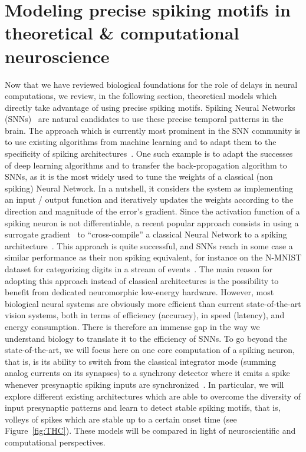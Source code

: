 \documentclass[brainsci, %
               review,submit,pdftex,moreauthors
               ]{Definitions/mdpi}
\begin{document}
\section{Modeling precise spiking motifs in theoretical \& computational neuroscience}
Now that we have reviewed biological foundations for the role of delays in neural computations, we review, in the following section, theoretical models which directly take advantage of using precise spiking motifs. 
Spiking Neural Networks (SNNs)~\citep{maass_networks_1997} are natural candidates to use these precise temporal patterns in the brain. The approach which is currently most prominent in the SNN community is to use existing algorithms from machine learning and to adapt them to the specificity of spiking architectures~\citep{goltz_fast_2021}. One such example is to adapt the successes of deep learning algorithms and to transfer the back-propagation algorithm to SNNs, as it is the most widely used to tune the weights of a classical (non spiking) Neural Network. In a nutshell, it considers the system as implementing an input / output function and iteratively updates the weights according to the direction and magnitude of the error's gradient. Since the activation function of a spiking neuron is not differentiable, a recent popular approach consists in using a surrogate gradient~\citep{neftci_surrogate_2019} to ``cross-compile'' a classical Neural Network to a spiking architecture~\citep{rueckauer_conversion_2017}. This approach is quite successful, and SNNs reach in some case a similar performance as their non spiking equivalent, for instance on the N-MNIST dataset for categorizing digits in a stream of events~\citep{susi_nmnsd-spiking_2021}. The main reason for adopting this approach instead of classical architectures is the possibility to benefit from dedicated neuromorphic low-energy hardware. However, most biological neural systems are obviously more efficient than current state-of-the-art vision systems, both in terms of efficiency (accuracy), in speed (latency), and energy consumption. There is therefore an immense gap in the way we understand biology to translate it to the efficiency of SNNs.  To go beyond the state-of-the-art, we will focus here on one core computation of a spiking neuron, that is, is its ability to switch from the classical integrator mode (summing analog currents on its synapses) to a synchrony detector where it emits a spike whenever presynaptic spiking inputs are synchronized~\citep{abeles_role_1982,paugam-moisy_computing_2012}. In particular, we will explore different existing architectures which are able to overcome the diversity of input presynaptic patterns and learn to detect stable spiking motifs, that is, volleys of spikes which are stable up to a certain onset time (see Figure~\ref{fig:THC}). These models will be compared in light of neuroscientific and computational perspectives. %
\end{document}

